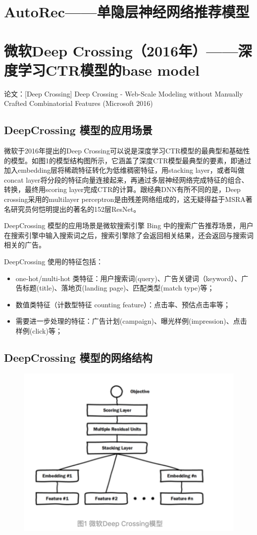 \documentclass[12pt]{article}
\begin{document}
\section{AutoRec——单隐层神经网络推荐模型}

\section{微软Deep Crossing（2016年）——深度学习CTR模型的base model}
论文：[Deep Crossing] Deep Crossing - Web-Scale Modeling without Manually Crafted Combinatorial Features (Microsoft 2016)

\subsection{DeepCrossing 模型的应用场景}
微软于2016年提出的Deep Crossing可以说是深度学习CTR模型的最典型和基础性的模型。如图1的模型结构图所示，它涵盖了深度CTR模型最典型的要素，即通过加入embedding层将稀疏特征转化为低维稠密特征，用stacking layer，或者叫做concat layer将分段的特征向量连接起来，再通过多层神经网络完成特征的组合、转换，最终用scoring layer完成CTR的计算。跟经典DNN有所不同的是，Deep crossing采用的multilayer perceptron是由残差网络组成的，这无疑得益于MSRA著名研究员何恺明提出的著名的152层ResNet。

DeepCrossing 模型的应用场景是微软搜索引擎 Bing 中的搜索广告推荐场景，用户在搜索引擎中输入搜索词之后，搜索引擎除了会返回相关结果，还会返回与搜索词相关的广告。

DeepCrossing 使用的特征包括：
\begin{itemize}
\setlength{\itemsep}{0pt}
\setlength{\parsep}{0pt}
\setlength{\parskip}{0pt}
    \item one-hot/multi-hot 类特征：用户搜索词(query)、广告关键词（keyword）、广告标题(title)、落地页(landing page)、匹配类型(match type)等；
    \item 数值类特征（计数型特征 counting feature）：点击率、预估点击率等；
    \item 需要进一步处理的特征：广告计划(campaign)、曝光样例(impression)、点击样例(click)等；
\end{itemize}

\subsection{DeepCrossing 模型的网络结构}
\begin{figure}[H]
    \centering
    \includegraphics[width=.6\textwidth]{fig/Microsoft_Deep_Crossing_Strucure.png}
\end{figure}
\end{document}
